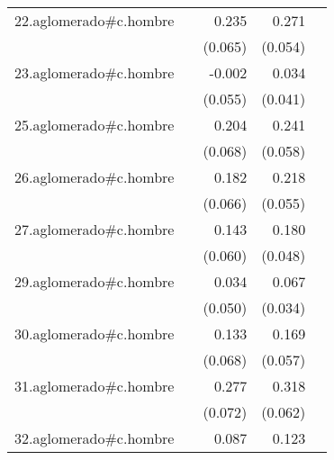 {\begin{longtable}{l*{4}{D{.}{.}{-1}}}
\addlinespace
22.aglomerado#c.hombre&                     &       0.235\sym{***}&       0.271\sym{***}&                     \\
            &                     &     (0.065)         &     (0.054)         &                     \\
\addlinespace
23.aglomerado#c.hombre&                     &      -0.002         &       0.034         &                     \\
            &                     &     (0.055)         &     (0.041)         &                     \\
\addlinespace
25.aglomerado#c.hombre&                     &       0.204\sym{**} &       0.241\sym{***}&                     \\
            &                     &     (0.068)         &     (0.058)         &                     \\
\addlinespace
26.aglomerado#c.hombre&                     &       0.182\sym{**} &       0.218\sym{***}&                     \\
            &                     &     (0.066)         &     (0.055)         &                     \\
\addlinespace
27.aglomerado#c.hombre&                     &       0.143\sym{*}  &       0.180\sym{***}&                     \\
            &                     &     (0.060)         &     (0.048)         &                     \\
\addlinespace
29.aglomerado#c.hombre&                     &       0.034         &       0.067\sym{*}  &                     \\
            &                     &     (0.050)         &     (0.034)         &                     \\
\addlinespace
30.aglomerado#c.hombre&                     &       0.133         &       0.169\sym{**} &                     \\
            &                     &     (0.068)         &     (0.057)         &                     \\
\addlinespace
31.aglomerado#c.hombre&                     &       0.277\sym{***}&       0.318\sym{***}&                     \\
            &                     &     (0.072)         &     (0.062)         &                     \\
\addlinespace
32.aglomerado#c.hombre&                     &       0.087         &       0.123\sym{***}&                     \\

\end{longtable}}
